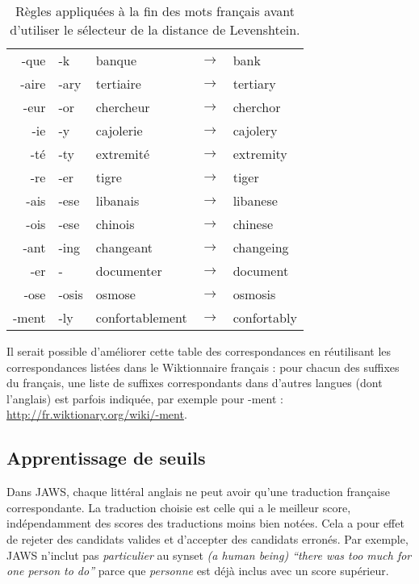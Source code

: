 \begin{table}[ht]
\centering
\begin{tabular}{rllcl}
  \toprule
-que & -k & banque &$\to$& bank \\
-aire & -ary & tertiaire &$\to$& tertiary \\
-eur & -or & chercheur &$\to$& cherchor \\
-ie & -y & cajolerie &$\to$& cajolery \\
-té & -ty & extremité &$\to$& extremity \\
-re & -er & tigre &$\to$& tiger \\
-ais & -ese & libanais &$\to$& libanese \\
-ois & -ese & chinois &$\to$& chinese \\
-ant & -ing & changeant &$\to$& changeing \\
-er & - & documenter &$\to$& document \\
-ose & -osis & osmose &$\to$& osmosis \\
-ment & -ly & confortablement &$\to$& confortably \\
  \bottomrule
\end{tabular}

\caption{\label{table:levenshteinrules}Règles appliquées à la fin des mots
français avant d'utiliser le sélecteur de la distance de Levenshtein.}

\end{table}

Il serait possible d'améliorer cette table des correspondances en réutilisant
les correspondances listées dans le Wiktionnaire français : pour chacun des
suffixes du français, une liste de suffixes correspondants dans d'autres
langues (dont l'anglais) est parfois indiquée, par exemple pour -ment :
\url{http://fr.wiktionary.org/wiki/-ment}.

\subsection{Apprentissage de seuils}
\label{subsec:learning_thresholds}

Dans JAWS, chaque littéral anglais ne peut avoir qu'une traduction française
correspondante. La traduction choisie est celle qui a le meilleur score,
indépendamment des scores des traductions moins bien notées. Cela a pour effet
de rejeter des candidats valides et d'accepter des candidats erronés. Par
exemple, JAWS n'inclut pas \textit{particulier} au synset \textit{(a human
being) ``there was too much for one person to do''} parce que \textit{personne}
est déjà inclus avec un score supérieur.

